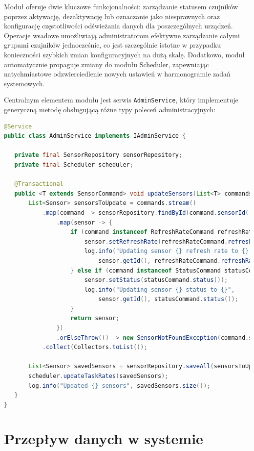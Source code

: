 \documentclass[a4paper,12pt,openany]{book}
\begin{document}
Moduł oferuje dwie kluczowe funkcjonalności: zarządzanie statusem czujników poprzez aktywację, dezaktywację lub oznaczanie jako niesprawnych oraz konfigurację częstotliwości odświeżania danych dla poszczególnych urządzeń. Operacje wsadowe umożliwiają administratorom efektywne zarządzanie całymi grupami czujników jednocześnie, co jest szczególnie istotne w przypadku konieczności szybkich zmian konfiguracyjnych na dużą skalę. Dodatkowo, moduł automatycznie propaguje zmiany do modułu Scheduler, zapewniając natychmiastowe odzwierciedlenie nowych ustawień w harmonogramie zadań systemowych.

Centralnym elementem modułu jest serwis \texttt{AdminService}, który implementuje generyczną metodę obsługującą różne typy poleceń administracyjnych:

\begin{lstlisting}[language=java,caption={Serwis Admin z metodą aktualizacji wsadowej},label={lst:admin-service}]
@Service
public class AdminService implements IAdminService {

   private final SensorRepository sensorRepository;
   private final Scheduler scheduler;

   @Transactional
   public <T extends SensorCommand> void updateSensors(List<T> commands) {
       List<Sensor> sensorsToUpdate = commands.stream()
           .map(command -> sensorRepository.findById(command.sensorId())
               .map(sensor -> {
                   if (command instanceof RefreshRateCommand refreshRateCommand) {
                       sensor.setRefreshRate(refreshRateCommand.refreshRate());
                       log.info("Updating sensor {} refresh rate to {} seconds",
                           sensor.getId(), refreshRateCommand.refreshRate());
                   } else if (command instanceof StatusCommand statusCommand) {
                       sensor.setStatus(statusCommand.status());
                       log.info("Updating sensor {} status to {}",
                           sensor.getId(), statusCommand.status());
                   }
                   return sensor;
               })
               .orElseThrow(() -> new SensorNotFoundException(command.sensorId())))
           .collect(Collectors.toList());

       List<Sensor> savedSensors = sensorRepository.saveAll(sensorsToUpdate);
       scheduler.updateTaskRates(savedSensors);
       log.info("Updated {} sensors", savedSensors.size());
   }
}
\end{lstlisting}

\section{Przepływ danych w systemie}
\end{document}
